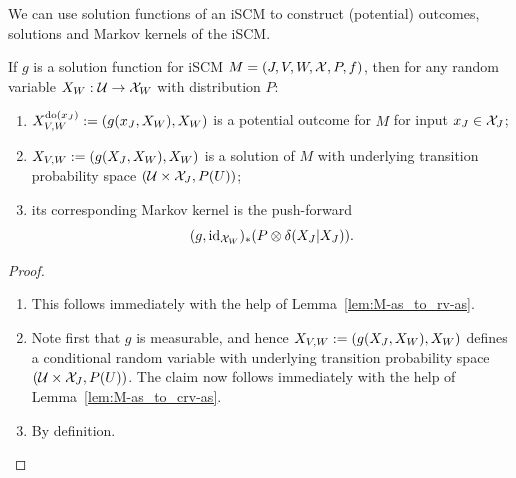 We can use solution functions of an iSCM to construct (potential) outcomes, solutions and Markov kernels of the iSCM.
\begin{Prp}\label{prp:using_solution_functions}
  If $g$ is a solution function for iSCM $M = \left ( J, V, W, \mathcal{X}, P, f \right )$, then for any random variable $X_{W} : \mathcal{U} \to \mathcal{X}_{W}$ with distribution $P$:
  \begin{enumerate}
    \item
      $X_{V,W}^{\operatorname{do}(x_{J})} := (g(x_{J}, X_{W}),X_{W})$ is a potential outcome for $M$ for input $x_{J}\in\mathcal{X}_{J}$;
    \item
      $X_{V,W} := (g(X_{J}, X_{W}),X_{W})$ is a solution of $M$
      with underlying transition probability space $(\mathcal{U} \times \mathcal{X}_{J}, P(U))$;
    \item its corresponding Markov kernel is the push-forward
      $$(g,\mathrm{id}_{\mathcal{X}_{W}})_* (P \otimes \delta(X_J|X_J)).$$
  \end{enumerate}
\end{Prp}
\begin{proof}
  \begin{enumerate}
    \item 
      This follows immediately with the help of Lemma~\ref{lem:M-as_to_rv-as}.
    \item 
      Note first that $g$ is measurable, and hence $X_{V,W} := (g(X_{J}, X_{W}),X_{W})$ defines a conditional random variable with underlying transition probability space $(\mathcal{U} \times \mathcal{X}_{J}, P(U))$.
      The claim now follows immediately with the help of Lemma~\ref{lem:M-as_to_crv-as}.
    \item By definition.
  \end{enumerate}
\end{proof}
